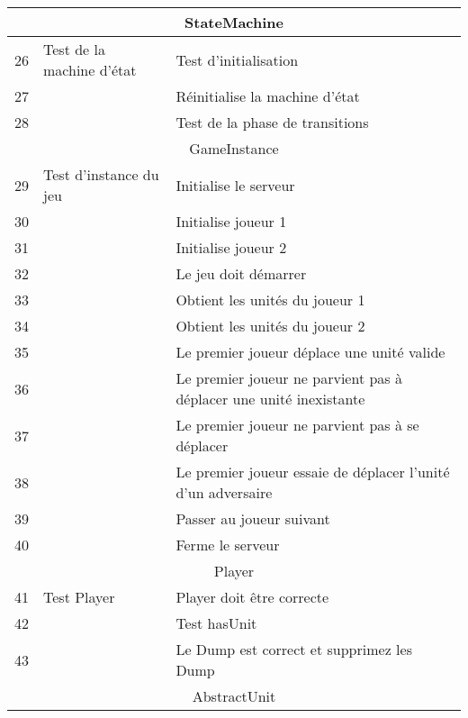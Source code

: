 \begin{center}
\begin{tabular}{|l|l|l|}
  
  
 \hline
\end{tabular}


\begin{tabular}{|l|l|l|}

    \hline
    \multicolumn{3}{|c|}{StateMachine} \\
    \hline
    
    26 & Test de la machine d'état & Test d'initialisation\\
    27 && Réinitialise la machine d'état \\
    28 && Test  de la phase de transitions \\
    
    
    
    
    \hline
    \multicolumn{3}{c}{GameInstance}\\
    \hline
    29 & Test d'instance du jeu & Initialise le serveur\\
    30 && Initialise joueur  1 \\
    31 && Initialise joueur 2 \\
    32 && Le jeu doit démarrer\\
    33 && Obtient les unités du joueur 1 \\
    34 && Obtient les unités du joueur 2 \\
    35 && Le premier joueur déplace une unité valide \\
    36 && Le premier joueur ne parvient pas à déplacer une unité inexistante \\
    37 && Le premier joueur ne parvient pas à se déplacer \\ %
    38 && Le premier joueur essaie de déplacer l'unité d'un adversaire\\
    39 && Passer au joueur suivant \\
    40 && Ferme le serveur \\
    
    
    \hline
    \multicolumn{3}{c}{Player}\\
     \hline
     41 & Test Player & Player doit être correcte\\
     42 && Test hasUnit \\
     43 && Le Dump est correct et supprimez les Dump \\

     
     \hline
     \multicolumn{3}{c}{AbstractUnit}\\
     \hline
     

\end{tabular}
\end{center}
